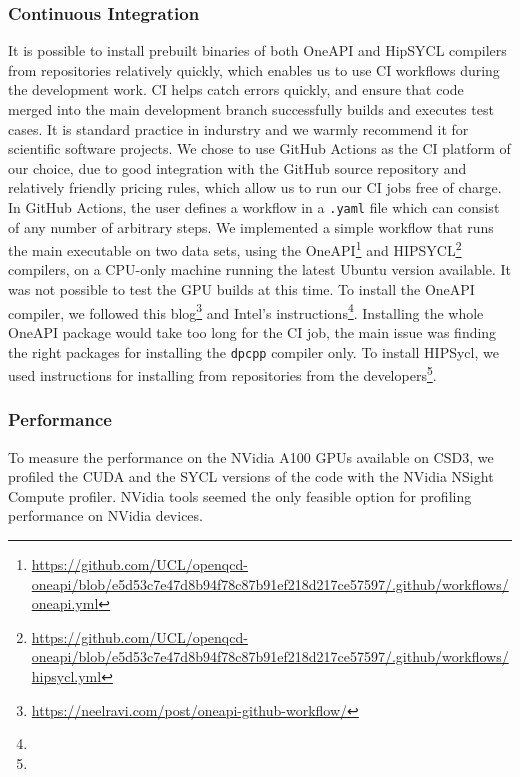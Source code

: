 
\subsubsection{Continuous Integration}

It is possible to install prebuilt binaries of both OneAPI and HipSYCL compilers from repositories relatively quickly, which enables us to use CI workflows during the development work.
CI helps catch errors quickly, and ensure that code merged into the main development branch successfully builds and executes test cases.
It is standard practice in indurstry and we warmly recommend it for scientific software projects.
We chose to use GitHub Actions as the CI platform of our choice, due to good integration with the GitHub source repository and relatively friendly pricing rules, which allow us to run our CI jobs free of charge.
In GitHub Actions, the user defines a workflow in a \verb #.yaml# file which can consist of any number of arbitrary steps.
We implemented a simple workflow that runs the main executable on two data sets, using the OneAPI\footnote{\url{https://github.com/UCL/openqcd-oneapi/blob/e5d53c7e47d8b94f78c87b91ef218d217ce57597/.github/workflows/oneapi.yml}} and HIPSYCL\footnote{\url{https://github.com/UCL/openqcd-oneapi/blob/e5d53c7e47d8b94f78c87b91ef218d217ce57597/.github/workflows/hipsycl.yml}} compilers, on a CPU-only machine running the latest Ubuntu version available.
It was not possible to test the GPU builds at this time.
To install the OneAPI compiler, we followed this blog\footnote{\url{https://neelravi.com/post/oneapi-github-workflow/}} and Intel's instructions\footnote{\oneapiaptinstall}.
Installing the whole OneAPI package would take too long for the CI job, the main issue was finding the right packages for installing the \verb #dpcpp# compiler only.
To install HIPSycl, we used instructions for installing from repositories from the developers\footnote{\hipsyclinstallfromrepos}.

\subsubsection{Performance}\label{sec:openqcd_performance}

To measure the performance on the NVidia A100 GPUs available on CSD3, we profiled the CUDA and the SYCL versions of the code with the NVidia NSight Compute profiler.
NVidia tools seemed the only feasible option for profiling performance on NVidia devices.

